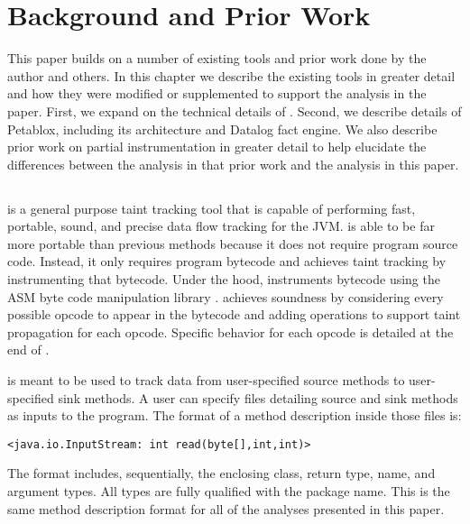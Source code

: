 \chapter{Background and Prior Work}
This paper builds on a number of existing tools and prior work done by
the author and others. In this chapter we describe the existing tools
in greater detail and how they were modified or supplemented to
support the analysis in the paper. First, we expand on the technical
details of \phosphor{}. Second, we describe details of Petablox,
including its architecture and Datalog fact engine. We also describe
prior work on partial instrumentation in greater detail to help
elucidate the differences between the analysis in that prior work and
the analysis in this paper.

\section{\phosphor{}}
\phosphor{} \cite{phosphor_oopsla} is a general purpose taint tracking
tool that is capable of performing fast, portable, sound, and precise
data flow tracking for the JVM. \phosphor{} is able to be far more
portable than previous methods because it does not require program
source code. Instead, it only requires program bytecode and achieves
taint tracking by instrumenting that bytecode. Under the hood,
\phosphor{} instruments bytecode using the ASM byte code manipulation
library \cite{bruneton2002asm}. \phosphor{} achieves soundness by
considering every possible opcode to appear in the bytecode and adding
operations to support taint propagation for each opcode. Specific
behavior for each opcode is detailed at the end of
\cite{phosphor_oopsla}.

\phosphor{} is meant to be used to track data from user-specified
source methods to user-specified sink methods. A user can specify
files detailing source and sink methods as inputs to the \phosphor{}
program. The format of a method description inside those files is:

\begin{center}
  \texttt{<java.io.InputStream: int read(byte[],int,int)>}
\end{center}

The format includes, sequentially, the enclosing class, return type,
name, and argument types. All types are fully qualified with the
package name. This is the same method description format for all of
the analyses presented in this paper.

